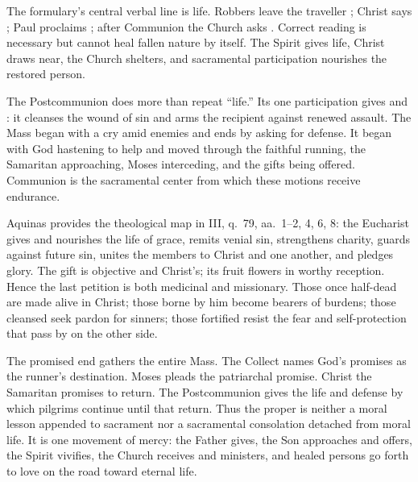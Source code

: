 The formulary's central verbal line is life. Robbers leave the traveller
; Christ says ; Paul proclaims
; after Communion the Church asks
. Correct
reading is necessary but cannot heal fallen nature by itself. The Spirit gives
life, Christ draws near, the Church shelters, and sacramental participation
nourishes the restored person.

The Postcommunion does more than repeat ``life.'' Its one participation gives
 and : it cleanses the wound of sin and arms
the recipient against renewed assault. The Mass began with a cry amid enemies
and ends by asking for defense. It began with God hastening to help and moved
through the faithful running, the Samaritan approaching, Moses interceding, and
the gifts being offered. Communion is the sacramental center from which these
motions receive endurance.

Aquinas provides the theological map in  III, q.~79, aa.~1--2, 4, 6,
8: the Eucharist gives and nourishes the life of grace, remits venial sin,
strengthens charity, guards against future sin, unites the members to Christ
and one another, and pledges glory. The gift is objective and Christ's; its
fruit flowers in worthy reception. Hence the last petition is both medicinal and missionary. Those once half-dead are made
alive in Christ; those borne by him become bearers of burdens; those cleansed
seek pardon for sinners; those fortified resist the fear and self-protection
that pass by on the other side.

The promised end gathers the entire Mass. The Collect names God's promises as
the runner's destination. Moses pleads the patriarchal promise. Christ the
Samaritan promises to return. The Postcommunion gives the life and defense by
which pilgrims continue until that return. Thus the proper is neither a moral
lesson appended to sacrament nor a sacramental consolation detached from moral
life. It is one movement of mercy: the Father gives, the Son approaches and
offers, the Spirit vivifies, the Church receives and ministers, and healed
persons go forth to love on the road toward eternal life.
